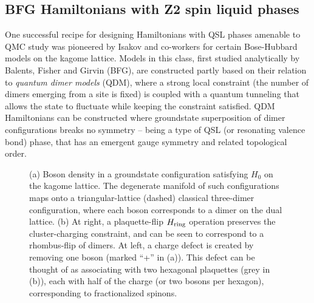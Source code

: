 \documentclass[range]{ar2e}
\begin{document}
\subsection{BFG Hamiltonians with Z2 spin liquid phases}


One successful recipe for designing Hamiltonians with QSL phases amenable to QMC study was pioneered by Isakov and co-workers \cite{Isakov1, Isakov2, TopoEE} for certain Bose-Hubbard models on the kagome lattice.  Models in this class, first studied analytically by Balents, Fisher and Girvin\cite{BFG} (BFG),
are constructed partly based on their relation to {\it quantum dimer models} (QDM), where a strong local constraint (the number of dimers emerging from a site is fixed) is coupled with a quantum tunneling that allows the state to fluctuate while keeping the constraint satisfied.  QDM Hamiltonians can be constructed where groundstate superposition of dimer configurations breaks no symmetry -- being a type of QSL (or resonating valence bond) phase, that has an emergent gauge symmetry and related topological order.


\begin{figure}
  \caption{ (a) Boson density in a groundstate configuration satisfying $H_0$ on the kagome lattice.  The degenerate manifold of such configurations maps onto a triangular-lattice (dashed) classical three-dimer configuration, where each boson corresponds to a dimer on the dual lattice.  (b) At right, a plaquette-flip $H_{\rm ring}$ operation preserves the cluster-charging constraint, and can be seen to correspond to a rhombus-flip of dimers.  At left, a charge defect is created by removing one boson (marked ``+'' in (a)).  This defect can be thought of as associating with two hexagonal plaquettes (grey in (b)), each with half of the charge (or two bosons per hexagon), corresponding to fractionalized spinons.} \label{kag_fig}
\end{figure}
\end{document}
